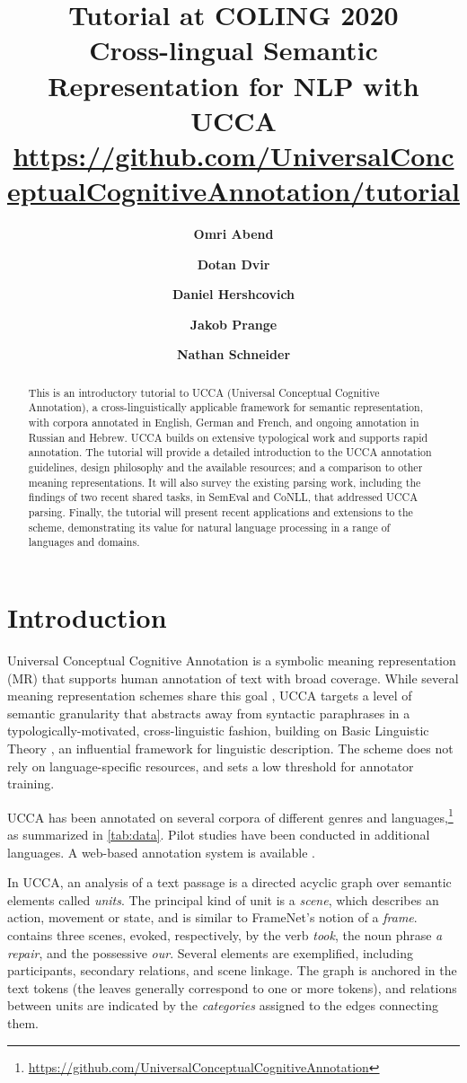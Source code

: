 \documentclass[11pt,a4paper,table]{article}
\title{Tutorial at COLING 2020 \\
Cross-lingual Semantic Representation for NLP with UCCA \\
\normalsize\url{https://github.com/UniversalConceptualCognitiveAnnotation/tutorial}}
\author[*]{\textbf{Omri Abend}}
\author[*]{\textbf{Dotan Dvir}}
\author[**]{\textbf{Daniel Hershcovich}}
\author[***]{\textbf{Jakob Prange}}
\author[***]{\textbf{Nathan Schneider}}
\affil[*]{Hebrew University of Jerusalem}
\affil[**]{University of Copenhagen}
\affil[***]{Georgetown University}
\affil[ ]{
\texttt{oabend@cs.huji.ac.il},\quad
\texttt{dotan.dvir@mail.huji.ac.il},\quad
\texttt{dh@di.ku.dk}}
\affil[ ]{
\texttt{jakob@cs.georgetown.edu},\quad
\texttt{nathan.schneider@georgetown.edu}
}
\begin{document}
\maketitle

\begin{abstract}
This is an introductory tutorial to UCCA (Universal Conceptual Cognitive Annotation), a cross-linguistically applicable framework for semantic representation, with corpora annotated in English, German and French, and ongoing annotation in Russian and Hebrew. UCCA builds on extensive typological work and supports rapid annotation. The tutorial will provide a detailed introduction to the UCCA annotation guidelines, design philosophy and the available resources; and a comparison to other meaning representations. It will also survey the existing parsing work, including the findings of two recent shared tasks, in SemEval and CoNLL, that addressed UCCA parsing. Finally, the tutorial will present recent applications and extensions to the scheme, demonstrating its value for natural language processing in a range of languages and domains.
\end{abstract}


\section{Introduction}\label{sec:introduction}

Universal Conceptual Cognitive Annotation \cite[UCCA;][]{abend2013universal} 
is a symbolic meaning representation (MR)
that supports human annotation of text with broad coverage.
While several meaning representation schemes share this goal
\citep{abend2017state}, UCCA targets a level of semantic granularity that abstracts away from syntactic paraphrases in a typologically-motivated, cross-linguistic fashion, building on Basic Linguistic Theory \citep{Dixon:basic}, an influential framework for linguistic description.
The scheme does not rely on language-specific resources, and sets a low
threshold for annotator training.

UCCA has been annotated on several corpora of different genres and
languages,\footnote{\scriptsize\url{https://github.com/UniversalConceptualCognitiveAnnotation}} as summarized in \cref{tab:data}.
Pilot studies have been conducted in additional languages.
A web-based annotation system is available \cite{abend2017uccaapp}.

In UCCA, an analysis of a text passage is a directed acyclic graph
over semantic elements called \textit{units}.
The principal kind of unit is a \textit{scene},
which describes an action, movement or state, and is similar to FrameNet's notion of a {\it frame}.
 contains three scenes, evoked, respectively,
by the verb \textit{took},
the noun phrase \textit{a repair}, and the possessive \textit{our}.
Several elements are exemplified, including participants,
secondary relations, and scene linkage.
The graph is anchored in the text tokens (the leaves generally correspond to one or more tokens), and relations between units
are indicated by the \textit{categories} assigned to the edges connecting them.
\end{document}
